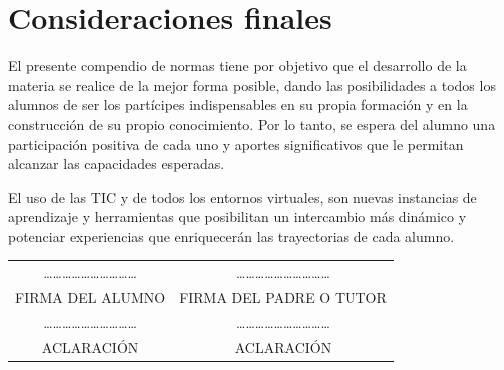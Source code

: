 \documentclass[../main]{subfiles}
\begin{document}
 

\section{Consideraciones finales}

El presente compendio de normas tiene por objetivo que el desarrollo de la materia se realice de la mejor forma posible, dando las posibilidades a todos los alumnos de ser los partícipes indispensables en su propia formación y en la construcción de su propio conocimiento. Por lo tanto, se espera del alumno una participación positiva de cada uno y aportes significativos que le permitan alcanzar las capacidades esperadas.  

El uso de las TIC y de todos los entornos virtuales, son nuevas instancias de aprendizaje y herramientas que posibilitan un intercambio más dinámico y potenciar experiencias que enriquecerán las trayectorias de cada alumno. 
\vspace{5cm}
\begin{table}[h!]
    \centering
    \begin{tabular}{c c}
…………………………          &
…………………………   \\
FIRMA DEL ALUMNO         & FIRMA DEL PADRE O TUTOR \\
…………………………          &
…………………………   \\
ACLARACIÓN & ACLARACIÓN \\
    \end{tabular}

\end{table}


 
\end{document}
